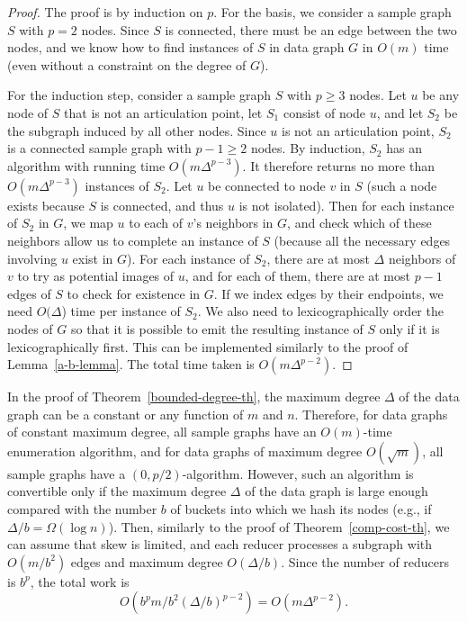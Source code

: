 \begin{proof}
The proof is by induction on $p$. For the basis, we consider a sample graph $S$ with $p = 2$ nodes. Since $S$ is connected, there must be an edge between the two nodes, and we know how to find instances of $S$ in data graph $G$ in $O(m)$ time (even without a constraint on the degree of $G$).

For the induction step, consider a sample graph $S$ with $p \geq 3$ nodes. Let $u$ be any node of $S$ that is not an articulation point, let $S_1$ consist of node $u$, and let $S_2$ be the subgraph induced by all other nodes. Since $u$ is not an articulation point, $S_2$ is a connected sample graph with $p-1 \geq 2$ nodes. By induction, $S_2$ has an algorithm with running time $O(m \Delta^{p-3})$. It therefore returns no more than $O(m \Delta^{p-3})$ instances of $S_2$. Let $u$ be connected to node $v$ in $S$ (such a node exists because $S$ is connected, and thus $u$ is not isolated). Then for each instance of $S_2$ in $G$, we map $u$ to each of $v$'s neighbors in $G$, and check which of these neighbors allow us to complete an instance of $S$ (because all the necessary edges involving $u$ exist in $G$). For each instance of $S_2$, there are at most $\Delta$ neighbors of $v$ to try as potential images of $u$, and for each of them, there are at most $p-1$ edges of $S$ to check for existence in $G$. If we index edges by their endpoints, we need $O(\Delta$) time per instance of $S_2$.  We also need to lexicographically order the nodes of $G$ so that it is possible to emit the resulting instance of $S$ only if it is lexicographically first. This can be implemented similarly to the proof of Lemma~\ref{a-b-lemma}. The total time taken is $O(m \Delta^{p-2})$.
\end{proof}

In the proof of Theorem~\ref{bounded-degree-th}, the maximum degree $\Delta$ of the data graph can be a constant or any function of $m$ and $n$. Therefore, for data graphs of constant maximum degree, all sample graphs have an $O(m)$-time enumeration algorithm, and for data graphs of maximum degree $O(\sqrt{m})$, all sample graphs have a $(0, p/2)$-algorithm. However, such an algorithm is convertible only if the maximum degree $\Delta$ of the data graph is large enough compared with the number $b$ of buckets into which we hash its nodes (e.g., if $\Delta / b = \Omega(\log n)$). Then, similarly to the proof of Theorem~\ref{comp-cost-th}, we can assume that skew is limited, and each reducer processes a subgraph with $O(m/b^2)$ edges and maximum degree $O(\Delta/b)$. Since the number of reducers is $b^p$, the total work is
$$O(b^p m/b^2 (\Delta/b)^{p-2}) = O(m\Delta^{p-2}).$$

